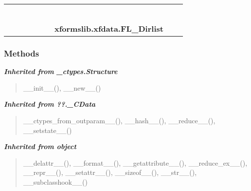    \label{xformslib:xfdata:FL_Dirlist}
\begin{tabular}{cccccccccc}
\multicolumn{2}{r}{\settowidth{\BCL}{object}\multirow{2}{\BCL}{object}}
&&
&&
&&
  \\\cline{3-3}
  &&\multicolumn{1}{c|}{}
&&
&&
&&
  \\
\multicolumn{4}{r}{\settowidth{\BCL}{??.\_CData}\multirow{2}{\BCL}{??.\_CData}}
&&
&&
  \\\cline{5-5}
  &&&&\multicolumn{1}{c|}{}
&&
&&
  \\
\multicolumn{6}{r}{\settowidth{\BCL}{\_ctypes.Structure}\multirow{2}{\BCL}{\_ctypes.Structure}}
&&
  \\\cline{7-7}
  &&&&&&\multicolumn{1}{c|}{}
&&
  \\
&&&&&&\multicolumn{2}{l}{\textbf{xformslib.xfdata.FL\_Dirlist}}
\end{tabular}



  \subsubsection{Methods}


\large{\textbf{\textit{Inherited from \_ctypes.Structure}}}

\begin{quote}
\_\_init\_\_(), \_\_new\_\_()
\end{quote}

\large{\textbf{\textit{Inherited from ??.\_CData}}}

\begin{quote}
\_\_ctypes\_from\_outparam\_\_(), \_\_hash\_\_(), \_\_reduce\_\_(), \_\_setstate\_\_()
\end{quote}

\large{\textbf{\textit{Inherited from object}}}

\begin{quote}
\_\_delattr\_\_(), \_\_format\_\_(), \_\_getattribute\_\_(), \_\_reduce\_ex\_\_(), \_\_repr\_\_(), \_\_setattr\_\_(), \_\_sizeof\_\_(), \_\_str\_\_(), \_\_subclasshook\_\_()
\end{quote}


